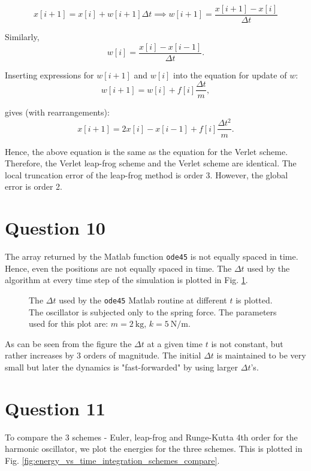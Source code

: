 \documentclass[10pt]{article}
\begin{document}
\begin{equation}
x[i+1] = x[i] + w[i+1]\Delta t \implies w[i+1] = \frac{x[i+1] - x[i]}{\Delta t}
\end{equation}

Similarly, 
\begin{equation*}
w[i] = \frac{x[i]-x[i-1]}{\Delta t}.
\end{equation*}

Inserting expressions for $w[i+1]$ and $w[i]$ into the equation for update of $w$:
\begin{equation}
w[i+1] = w[i] + f[i]\frac{\Delta t}{m},
\end{equation}

gives (with rearrangements):
\begin{equation}
x[i+1] = 2x[i] - x[i-1] + f[i]\frac{\Delta t^2}{m}. 
\end{equation}

Hence, the above equation is the same as the equation for the Verlet scheme. Therefore, the Verlet leap-frog scheme and the Verlet scheme are identical. The local truncation error of the leap-frog method is order 3. However, the global error is order 2. 

\section*{Question 10}
The array returned by the Matlab function \texttt{ode45} is not equally spaced in time. Hence, even the positions are not equally spaced in time. The $\Delta t$ used by the algorithm at every time step of the simulation is plotted in Fig. \ref{fig:ode45_timestep}.

\begin{figure}[!htb]
\centering

\caption{The $\Delta t$ used by the \texttt{ode45} Matlab routine at different $t$ is plotted. The oscillator is subjected only to the spring force. The parameters used for this plot are: $m=2\ \mathrm{kg}$, $k=5\ \mathrm{N/m}$.}
\label{fig:ode45_timestep}
\end{figure}

As can be seen from the figure the $\Delta t$ at a given time $t$ is not constant, but rather increases by 3 orders of magnitude. The initial $\Delta t$ is maintained to be very small but later the dynamics is "fast-forwarded" by using larger $\Delta t$'s. 

\section*{Question 11}
To compare the 3 schemes - Euler, leap-frog and Runge-Kutta 4th order for the harmonic oscillator, we plot the energies for the three schemes. This is plotted in Fig. \ref{fig:energy_vs_time_integration_schemes_compare}.
\end{document}
